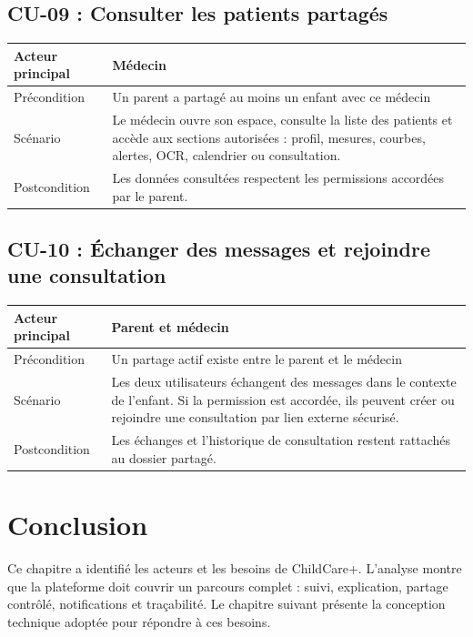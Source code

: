 \subsection{CU-09 : Consulter les patients partagés}
\begin{tabularx}{\textwidth}{|l|X|}
\hline
Acteur principal & Médecin \\
\hline
Précondition & Un parent a partagé au moins un enfant avec ce médecin \\
\hline
Scénario & Le médecin ouvre son espace, consulte la liste des patients et accède aux sections autorisées : profil, mesures, courbes, alertes, OCR, calendrier ou consultation. \\
\hline
Postcondition & Les données consultées respectent les permissions accordées par le parent. \\
\hline
\end{tabularx}

\subsection{CU-10 : Échanger des messages et rejoindre une consultation}
\begin{tabularx}{\textwidth}{|l|X|}
\hline
Acteur principal & Parent et médecin \\
\hline
Précondition & Un partage actif existe entre le parent et le médecin \\
\hline
Scénario & Les deux utilisateurs échangent des messages dans le contexte de l'enfant. Si la permission est accordée, ils peuvent créer ou rejoindre une consultation par lien externe sécurisé. \\
\hline
Postcondition & Les échanges et l'historique de consultation restent rattachés au dossier partagé. \\
\hline
\end{tabularx}

\section*{Conclusion}
Ce chapitre a identifié les acteurs et les besoins de ChildCare+. L'analyse montre que la plateforme doit couvrir un parcours complet : suivi, explication, partage contrôlé, notifications et traçabilité. Le chapitre suivant présente la conception technique adoptée pour répondre à ces besoins.
